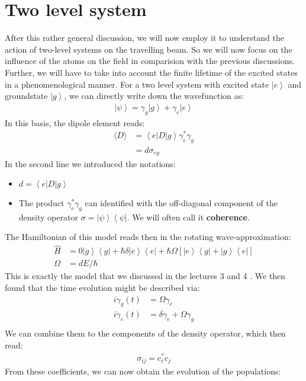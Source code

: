 \documentclass[10pt]{article}
\let\cite\citep
\providecommand\citep{\cite}
\newcommand{\bra}[1]{\ensuremath{\left\langle#1\right|}}
\newcommand{\ket}[1]{\ensuremath{\left|#1\right\rangle}}
\begin{document}
\section{Two level system}
After this rather general discussion, we will now employ it to understand the action of two-level systems on the travelling beam. So we will now focus on the influence of the atoms on the field in comparision with the previous discussions. Further, we will have to take into account the finite lifetime of the excited states in a phenomenological manner. For a two level system with excited state $\ket{e}$ and groundstate $\ket{g}$, we can directly write down the wavefunction as:
\begin{align}
\ket{\psi} = \gamma_g\ket{g}+ \gamma_e\ket{e}
\end{align}
In this basis, the dipole element reads:
\begin{align}
\langle D\rangle &= \bra{e}D\ket{g} \gamma_e^*\gamma_g\\
&= d \sigma_{eg}
\end{align}
In the second line we introduced the notations:
\begin{itemize}
\item $d = \bra{e}D\ket{g}$
\item The product $\gamma_e^*\gamma_g$ can identified with the off-diagonal component of the density operator $\sigma=\ket{\psi}\bra{\psi}$. We will often call it \textbf{coherence}.
\end{itemize}
The Hamiltonian of this model reads then in the rotating wave-approximation:
\begin{align}
\hat{H} &= 0\ket{g}\bra{g}+\hbar\delta \ket{e}\bra{e} + \hbar\Omega\left[\ket{e}\bra{g}+\ket{g}\bra{e}\right]\\
\Omega &= d E/\hbar
\end{align}
This is exactly the model that we discussed in the lectures 3 and 4 \cite{Jendrzejewskib,Jendrzejewskia}. We then found that the time evolution might be described via:
\begin{align}
i\dot{\gamma}_g(t) &= \Omega \gamma_e\\
i\dot{\gamma}_e(t) &= \delta \gamma_e +\Omega \gamma_g\\
\end{align}
We can combine them to the components of the density operator, which then read:
\begin{align}
\sigma_{ij} = c_{i}^*c_j
\end{align}
From these coefficients, we can now obtain the evolution of the populations:
\end{document}
